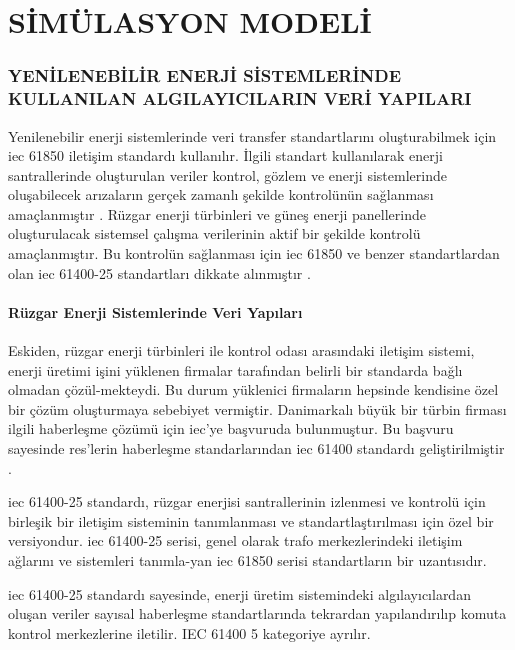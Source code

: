 \part{SİMÜLASYON MODELİ}
\thispagestyle{empty}
\newpage
\section{YENİLENEBİLİR ENERJİ SİSTEMLERİNDE KULLANILAN ALGILAYICILARIN VERİ YAPILARI}

Yenilenebilir enerji sistemlerinde veri transfer standartlarını oluşturabilmek için \gls{iec} 61850 iletişim standardı kullanılır. İlgili standart kullanılarak enerji santrallerinde oluşturulan veriler kontrol, gözlem ve enerji sistemlerinde oluşabilecek arızaların gerçek zamanlı şekilde kontrolünün sağlanması amaçlanmıştır \cite{1385190}. Rüzgar enerji türbinleri ve güneş enerji panellerinde oluşturulacak sistemsel çalışma verilerinin aktif bir şekilde kontrolü amaçlanmıştır. Bu kontrolün sağlanması için \gls{iec} 61850 ve benzer standartlardan olan \gls{iec} 61400-25 standartları dikkate alınmıştır \cite{Olsen_prototypeof} \cite{francisco2016protection}.


\subsection{Rüzgar Enerji Sistemlerinde Veri Yapıları}
Eskiden, rüzgar enerji türbinleri ile kontrol odası arasındaki iletişim sistemi, enerji üretimi işini yüklenen firmalar tarafından belirli bir standarda bağlı olmadan çözül-mekteydi. Bu durum yüklenici firmaların hepsinde kendisine özel bir çözüm oluşturmaya sebebiyet vermiştir. Danimarkalı büyük bir türbin firması ilgili haberleşme çözümü için \gls{iec}'ye başvuruda bulunmuştur. Bu başvuru sayesinde \gls{res}'lerin haberleşme standarlarından \gls{iec} 61400 standardı geliştirilmiştir \cite{Olsen_prototypeof}.

\gls{iec} 61400-25 standardı, rüzgar enerjisi santrallerinin izlenmesi ve kontrolü için birleşik bir iletişim sisteminin tanımlanması ve standartlaştırılması için özel bir versiyondur. \gls{iec} 61400-25 serisi, genel olarak trafo merkezlerindeki iletişim ağlarını ve sistemleri tanımla-yan \gls{iec} 61850 serisi standartların bir uzantısıdır. 


\gls{iec} 61400-25 standardı sayesinde, enerji üretim sistemindeki algılayıcılardan oluşan veriler sayısal haberleşme standartlarında tekrardan yapılandırılıp komuta kontrol merkezlerine iletilir. IEC 61400 5 kategoriye ayrılır.

